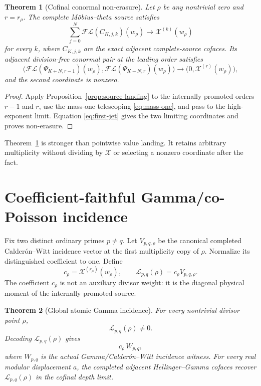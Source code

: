 \documentclass[11pt]{article}
\newtheorem{theorem}{Theorem}[section]
\theoremstyle{definition}
\theoremstyle{remark}
\newcommand{\XiC}{\mathcal X}
\begin{document}
\begin{theorem}[Cofinal conormal non-erasure]
\label{thm:conormal}
Let \(\rho\) be any nontrivial zero and \(r=r_\rho\).  The complete
M\"obius--theta source satisfies
\[
 \sum_{j=0}^{N}\mathcal{FL}(C_{K,j,k})(w_\rho)
 \longrightarrow \XiC^{(k)}(w_\rho)
\]
for every \(k\), where \(C_{K,j,k}\) are the exact adjacent complete-source
cofaces.  Its adjacent division-free conormal pair at the leading
order satisfies
\[
 \bigl(\mathcal{FL}(\Psi_{K+N,r-1})(w_\rho),
       \mathcal{FL}(\Psi_{K+N,r})(w_\rho)\bigr)
 \longrightarrow
 \bigl(0,\XiC^{(r)}(w_\rho)\bigr),
\tag{3.4}\label{eq:vertical-conormal}
\]
and the second coordinate is nonzero.
\end{theorem}

\begin{proof}
Apply Proposition~\ref{prop:source-landing} to the internally promoted
orders \(r-1\) and \(r\), use the mass-one telescoping
\eqref{eq:mass-one}, and pass to the high-exponent limit.  Equation
\eqref{eq:first-jet} gives the two limiting coordinates and proves
non-erasure.
\end{proof}

Theorem~\ref{thm:conormal} is stronger than pointwise value landing.  It
retains arbitrary multiplicity without dividing by \(\XiC\) or selecting a
nonzero coordinate after the fact.

\section{Coefficient-faithful Gamma/co-Poisson incidence}

Fix two distinct ordinary primes \(p\neq q\).  Let \(V_{p,q,\rho}\) be the
canonical completed Calder\'on--Witt incidence vector at the first
multiplicity copy of \(\rho\).  Normalize its distinguished coefficient to
one.  Define
\[
 c_\rho=\XiC^{(r_\rho)}(w_\rho),
 \qquad
 \mathcal L_{p,q}(\rho)=c_\rho V_{p,q,\rho}.
\tag{4.1}\label{eq:gamma-landing}
\]
The coefficient \(c_\rho\) is not an auxiliary divisor weight: it is the
diagonal physical moment of the internally promoted source.

\begin{theorem}[Global atomic Gamma incidence]
\label{thm:gamma-atomic}
For every nontrivial divisor point \(\rho\),
\[
 \mathcal L_{p,q}(\rho)\neq0.
\tag{4.2}\label{eq:gamma-nonzero}
\]
Decoding \(\mathcal L_{p,q}(\rho)\) gives
\[
 c_\rho\,W_{p,q},
\tag{4.3}\label{eq:decoded-witness}
\]
where \(W_{p,q}\) is the actual Gamma/Calder\'on--Witt incidence witness.
For every real modular displacement \(a\), the completed adjacent
Hellinger--Gamma cofaces recover \(\mathcal L_{p,q}(\rho)\) in the cofinal
depth limit.
\end{theorem}
\end{document}
